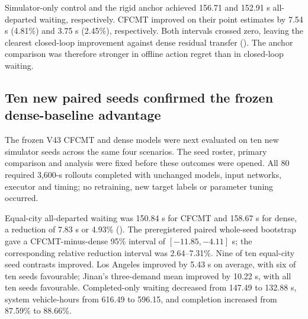 Simulator-only control and the rigid anchor achieved 156.71 and 152.91 s
all-departed waiting, respectively.  CFCMT improved on their point estimates
by 7.54 s (4.81\%) and 3.75 s (2.45\%), respectively.  Both intervals crossed
zero, leaving the clearest closed-loop improvement against dense residual
transfer ().  The anchor comparison was therefore
stronger in offline action regret than in closed-loop waiting.

\begin{table}[t]
\caption{Original two-seed, seven-policy external 3,600-s city-macro results.
Scenarios are
weighted equally within each city and the two cities are weighted equally.
Waiting times are seconds; system burden is vehicle-hours.  ``Incidents'' is
the equal-city mean of unique SUMO junction-collision incidents.}
\label{tab:external-closed-loop}
\centering
\scriptsize
\resizebox{\textwidth}{!}{}
\end{table}

\begin{table}[t]
\caption{Original two-seed CFCMT policy contrasts for all-departed waiting.  Positive
gains favour CFCMT.  Intervals are descriptive, not population-level city
inference.}
\label{tab:external-comparisons}
\centering
\scriptsize
\resizebox{\textwidth}{!}{}
\end{table}

\subsection{Ten new paired seeds confirmed the frozen dense-baseline advantage}
\label{sec:v43-dense-fresh10}

The frozen V43 CFCMT and dense models were next evaluated on ten new simulator
seeds across the same four scenarios.  The seed roster, primary comparison and
analysis were fixed before these outcomes were opened.  All 80 required
3,600-s rollouts completed with unchanged models, input networks, executor and
timing; no retraining, new target labels or parameter tuning occurred.

Equal-city all-departed waiting was 150.84 s for CFCMT and 158.67 s for dense,
a reduction of 7.83 s or 4.93\%
().  The preregistered paired
whole-seed bootstrap gave a CFCMT-minus-dense 95\% interval of
$[-11.85,-4.11]$ s; the corresponding relative reduction interval was
2.64--7.31\%.  Nine of ten equal-city seed contrasts improved.  Los Angeles
improved by 5.43 s on average, with six of ten seeds favourable; Jinan's
three-demand mean improved by 10.22 s, with all ten seeds favourable.
Completed-only waiting decreased from 147.49 to 132.88 s, system vehicle-hours
from 616.49 to 596.15, and completion increased from 87.59\% to 88.66\%.

